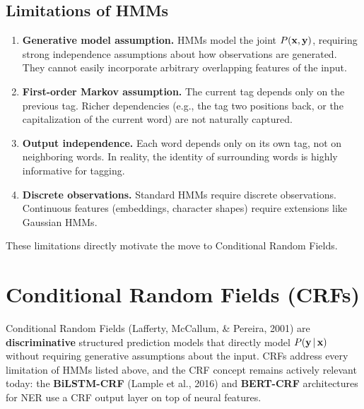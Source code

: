 \subsection{Limitations of HMMs}

\begin{enumerate}
    \item \textbf{Generative model assumption.}  HMMs model the joint
    $P(\mathbf{x}, \mathbf{y})$, requiring strong independence assumptions about how
    observations are generated.  They cannot easily incorporate arbitrary
    overlapping features of the input.

    \item \textbf{First-order Markov assumption.}  The current tag depends
    only on the previous tag.  Richer dependencies (e.g., the tag two
    positions back, or the capitalization of the current word) are not
    naturally captured.

    \item \textbf{Output independence.}  Each word depends only on its own
    tag, not on neighboring words.  In reality, the identity of surrounding
    words is highly informative for tagging.

    \item \textbf{Discrete observations.}  Standard HMMs require discrete
    observations.  Continuous features (embeddings, character shapes) require
    extensions like Gaussian HMMs.
\end{enumerate}

These limitations directly motivate the move to Conditional Random Fields.


\section{Conditional Random Fields (CRFs)}
\label{sec:crf}

Conditional Random Fields (Lafferty, McCallum, \& Pereira, 2001) are
\textbf{discriminative} structured prediction models that directly model
$P(\mathbf{y} \,|\, \mathbf{x})$ without requiring generative assumptions about the input.
CRFs address every limitation of HMMs listed above, and the CRF concept
remains actively relevant today: the \textbf{BiLSTM-CRF} (Lample et al.,
2016) and \textbf{BERT-CRF} architectures for NER use a CRF output layer
on top of neural features.

